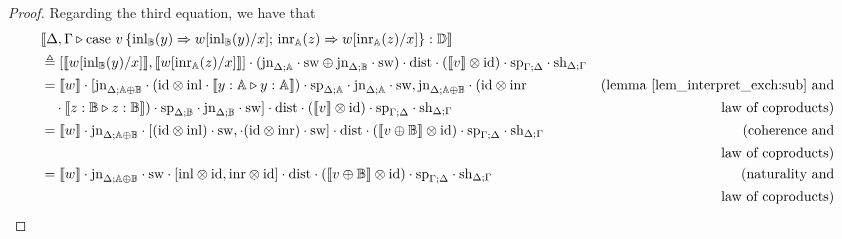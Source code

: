 \documentclass[10pt,a4paper]{amsart}
\theoremstyle{definition}
\theoremstyle{definition}
\theoremstyle{definition}
\theoremstyle{definition}
\theoremstyle{definition}
\theoremstyle{definition}
\begin{document}
\begin{proof}
Regarding the third equation, we have that
\begin{align*}
  & \llbracket \Delta,\Gamma \vljud \text{case } v\, \{\text{inl}_{\typeB} (y) \Rightarrow w [ \text{inl}_{\typeB}(y)/x] ;\, \text{inr}_{\typeA} (z) \Rightarrow w [ \text{inr}_{\typeA}(z)/x]\}: \typeD\rrbracket \\
  & \triangleq  [\llbracket  w [ \text{inl}_{\typeB}(y)/x] \rrbracket, \llbracket  w [ \text{inr}_{\typeA}(z)/x] \rrbracket] \comp (\text{jn}_{\Delta;\typeA} \comp \sw \oplus \text{jn}_{\Delta;\typeB} \comp \sw  ) \comp \dist \comp (\llbracket v\rrbracket \otimes \text{id}) \comp  \text{sp}_{\Gamma;\Delta} \comp \text{sh}_{\Delta;\Gamma} \\
  & = \llbracket w \rrbracket \comp [\text{jn}_{\Delta;\typeA \oplus \typeB} \comp (\text{id} \otimes\inl \comp  \llbracket y:\typeA \vljud y:\typeA  \rrbracket) \comp \text{sp}_{\Delta;\typeA} \comp \text{jn}_{\Delta;\typeA} \comp \sw , 
   \text{jn}_{\Delta;\typeA \oplus \typeB} \comp (\text{id} \otimes\inr  & {\text{(lemma \ref{lem_interpret_exch:sub} and}} \\
  &  \hspace{10pt} \comp \llbracket z:\typeB \vljud z:\typeB  \rrbracket) \comp \text{sp}_{\Delta;\typeB} \comp \text{jn}_{\Delta;\typeB} \comp \sw  ] \comp \dist \comp (\llbracket v\rrbracket \otimes \text{id}) \comp  \text{sp}_{\Gamma;\Delta} \comp \text{sh}_{\Delta;\Gamma} & {\text{law of coproducts)}}  \\
  & =  \llbracket w \rrbracket \comp \text{jn}_{\Delta;\typeA \oplus \typeB} \comp [ (\text{id} \otimes\inl)  \comp \sw  ,     \comp (\text{id} \otimes\inr) \comp \sw  ] \comp \dist  \comp (\llbracket v \oplus \typeB\rrbracket \otimes \text{id})  \comp  \text{sp}_{\Gamma;\Delta} \comp \text{sh}_{\Delta;\Gamma}  & {\text{(coherence and}}   \\
  & \hspace{10pt} & {\text{law of coproducts)}}   \\
  & = \llbracket w \rrbracket \comp \text{jn}_{\Delta;\typeA \oplus \typeB}  \comp   \sw \comp  [\inl \otimes \text{id} , \inr \otimes \text{id}] \comp \dist   \comp (\llbracket v \oplus \typeB\rrbracket \otimes \text{id})  \comp  \text{sp}_{\Gamma;\Delta} \comp \text{sh}_{\Delta;\Gamma}  & {\text{(naturality and}}  \\
  & \hspace{10pt} & {\text{law of coproducts})}   \\

\end{align*}
\end{proof}
\end{document}
